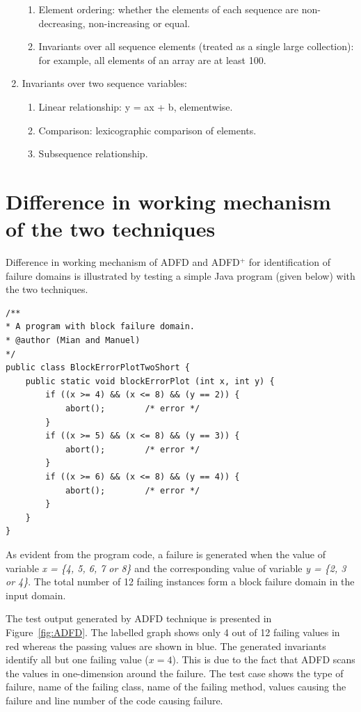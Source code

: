 \begin{enumerate}
\begin{enumerate}
	\item Element ordering: whether the elements of each sequence are non-decreasing, non-increasing or equal.
	\item Invariants over all sequence elements (treated as a single large collection): for example, all elements of an array are at least 100.
	\end{enumerate}
\item Invariants over two sequence variables: 
	\begin{enumerate}
	\item Linear relationship: y = ax + b, elementwise. 
	\item Comparison: lexicographic comparison of elements. 
	\item Subsequence relationship.
	\end{enumerate}
\end{enumerate}








\section{Difference in working mechanism of the two techniques}
Difference in working mechanism of ADFD and ADFD$^+$ for identification of failure domains is illustrated by testing a simple Java program (given below) with the two techniques. 
\bigskip
\begin{lstlisting}
/** 
* A program with block failure domain.
* @author (Mian and Manuel)
*/
public class BlockErrorPlotTwoShort {
	public static void blockErrorPlot (int x, int y) {
		if ((x >= 4) && (x <= 8) && (y == 2)) { 
			abort();		/* error */
		}
		if ((x >= 5) && (x <= 8) && (y == 3)) { 
			abort();		/* error */
		}
		if ((x >= 6) && (x <= 8) && (y == 4)) { 
			abort();		/* error */
		}
	}
}
\end{lstlisting}
\bigskip


As evident from the program code, a failure is generated when the value of variable \textit{x = \{4, 5, 6, 7 or 8\}} and the corresponding value of variable \textit{y = \{2, 3 or 4\}}. The total number of 12 failing instances form a block failure domain in the input domain.

The test output generated by ADFD technique is presented in Figure~\ref{fig:ADFD}. The labelled graph shows only 4 out of 12 failing values in red whereas the passing values are shown in blue. The generated invariants identify all but one failing value ($x = 4$). This is due to the fact that ADFD scans the values in one-dimension around the failure. The test case shows the type of failure, name of the failing class, name of the failing method, values causing the failure and line number of the code causing failure.

